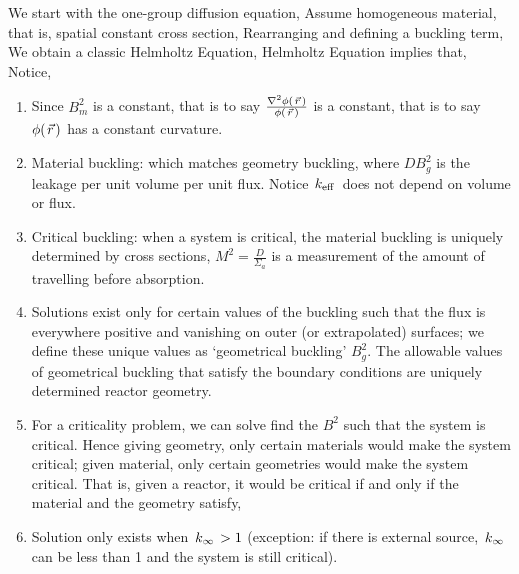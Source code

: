 \documentclass{school-22.211-notes}
\date{March 19, 2012}
\begin{document}
\maketitle

We start with the one-group diffusion equation,
Assume homogeneous material, that is, spatial constant cross section,
Rearranging and defining a buckling term, 
We obtain a classic Helmholtz Equation,
Helmholtz Equation implies that,
Notice,
\begin{enumerate}
\item Since $B_m^2$ is a constant, that is to say $\frac{\nabla^2 \phi(\left.\vec{r}\right.)}{\phi(\left.\vec{r}\right.)}$ is a constant, that is to say $\phi(\left.\vec{r}\right.)$ has a constant curvature. 
\item Material buckling: 
  which matches geometry buckling, 
  where $DB^2_g$ is the leakage per unit volume per unit flux. Notice $\left. k_{\mathrm{eff}} \right.$ does not depend on volume or flux. 

\item Critical buckling: when a system is critical, the material buckling is uniquely determined by cross sections, 
   $M^2 = \frac{D}{\Sigma_a}$ is a measurement of the amount of travelling before absorption. 

\item Solutions exist only for certain values of the buckling such that the flux is everywhere positive and vanishing on outer (or extrapolated) surfaces; we define these unique values as `geometrical buckling' $B_g^2$. The allowable values of geometrical buckling that satisfy the boundary conditions are uniquely determined reactor geometry.

\item For a criticality problem, we can solve find the $B^2$ such that the system is critical. Hence giving geometry, only certain materials would make the system critical; given material, only certain geometries would make the system critical. That is, given a reactor, it would be critical if and only if the material and the geometry satisfy,

\item Solution only exists when $\left. k_{\infty} \right. > 1$ (exception: if there is external source, $\left. k_{\infty} \right.$ can be less than 1 and the system is still critical). 
\end{enumerate}
\end{document}
